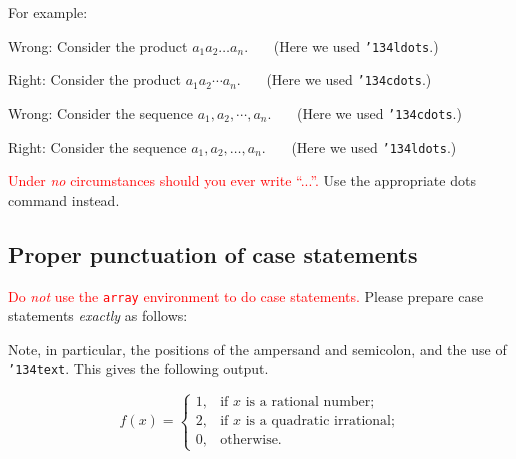 \documentclass[12pt]{article}
\begin{document}
For example:

\medskip

Wrong:  Consider the product $a_1 a_2 \ldots a_n$.  \ \ \   (Here we used {\tt \char'134ldots}.)

Right:  Consider the product $a_1 a_2 \cdots a_n$.  \ \ \    (Here we used {\tt \char'134cdots}.)

\bigskip

Wrong:  Consider the sequence $a_1, a_2, \cdots, a_n$.  \ \ \   (Here we used {\tt \char'134cdots}.)

Right:  Consider the sequence $a_1, a_2, \ldots, a_n$.  \ \ \   (Here we used {\tt \char'134ldots}.)

\bigskip

\textcolor{red}{Under {\it no\/}
circumstances should you ever write ``...''.}  Use the appropriate
dots command instead.

\subsection{Proper punctuation of case statements}

\textcolor{red}{Do {\it not\/} use the {\tt array} environment to do case statements.}  
Please prepare case statements {\it exactly\/} as follows:
\medskip


\medskip

Note, in particular, the positions of the ampersand and semicolon,
and the use of {\tt \char'134text}.  This gives the following output.

\begin{displaymath}
f(x) = \begin{cases}
	1, & \text{if $x$ is a rational number;} \\
	2, & \text{if $x$ is a quadratic irrational;} \\ 
	0, & \text{otherwise.}
	\end{cases}
\end{displaymath}
\end{document}
